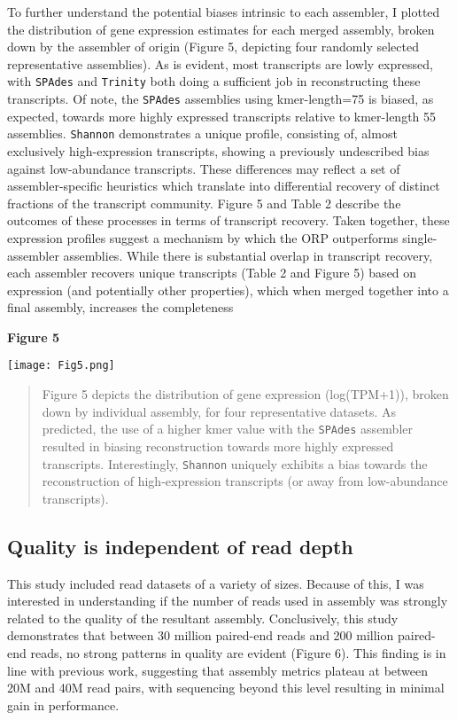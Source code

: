 \documentclass[10pt,letterpaper]{article}
\begin{document}
To further understand the potential biases intrinsic to each assembler, I plotted the distribution of gene expression estimates for each merged assembly, broken down by the assembler of origin (Figure 5, depicting four randomly selected representative assemblies). As is evident, most transcripts are lowly expressed, with \texttt{SPAdes} and \texttt{Trinity} both doing a sufficient job in reconstructing these transcripts. Of note, the \texttt{SPAdes} assemblies using kmer-length=75 is biased, as expected, towards more highly expressed transcripts relative to kmer-length 55 assemblies. \texttt{Shannon} demonstrates a unique profile, consisting of, almost exclusively high-expression transcripts, showing a previously undescribed bias against low-abundance transcripts. These differences may reflect a set of assembler-specific heuristics which translate into differential recovery of distinct fractions of the transcript community. Figure 5 and Table 2 describe the outcomes of these processes in terms of transcript recovery. Taken together, these expression profiles suggest a mechanism by which the ORP outperforms single-assembler assemblies. While there is substantial overlap in transcript recovery, each assembler recovers unique transcripts (Table 2 and Figure 5) based on expression (and potentially other properties), which when merged together into a final assembly, increases the completeness 

 

\textbf{\hypertarget{Figure 5}{Figure 5}} \\
\centerline{\texttt{[image: Fig5.png]}}
\begin{quote}
\small{Figure 5 depicts the distribution of gene expression (log(TPM+1)), broken down by individual assembly, for four representative datasets. As predicted, the use of a higher kmer value with the \texttt{SPAdes} assembler resulted in biasing reconstruction towards more highly expressed transcripts. Interestingly, \texttt{Shannon} uniquely exhibits a bias towards the reconstruction of high-expression transcripts (or away from low-abundance transcripts).}
\end{quote} 


\subsection{Quality is independent of read depth}

This study included read datasets of a variety of sizes. Because of this, I was interested in understanding if the number of reads used in assembly was strongly related to the quality of the resultant assembly. Conclusively, this study demonstrates that between 30 million paired-end reads and 200 million paired-end reads, no strong patterns in quality are evident (Figure 6). This finding is in line with previous work, \citep{MacManes:2015iz} suggesting that assembly metrics plateau at between 20M and 40M read pairs, with sequencing beyond this level resulting in minimal gain in performance.  
\end{document}
